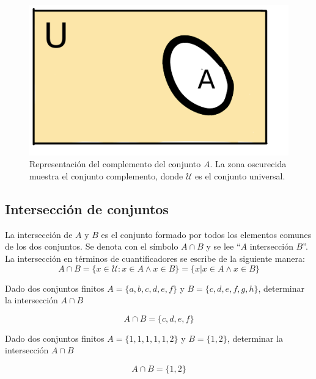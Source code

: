 \begin{center}
	\begin{figure}[ht!]
	\centering
    		\includegraphics[scale=0.5]{FiguresBM/complemento}
    		\caption[Representación del complemento del conjunto $A$]{Representación del complemento del conjunto $A$. La zona oscurecida muestra el conjunto complemento, donde $\mathcal{U}$ es el conjunto universal.}
	\end{figure}
\end{center}

\subsection{Intersección de conjuntos }
La intersección de $A$ y $B$ es el conjunto formado por todos los elementos comunes de los dos conjuntos. Se denota con el símbolo $A\cap B$ y se lee ``$A$ intersección $B$''. La intersección en términos de cuantificadores se escribe de la siguiente manera:\\
\begin{equation}
A\cap B=\{x\in\mathcal{U}:x\in A\wedge x\in B\}=\{x|x\in A\wedge x\in B\}
\end{equation} 

\begin{myexample}
Dado dos conjuntos finitos $A=\{a,b,c,d,e,f\}$ y $B=\{c,d,e,f,g,h\}$, determinar la intersección $A\cap B$
\end{myexample}
\begin{equation*}
A\cap B=\{c,d,e,f\}
\end{equation*}
\begin{myexample}
Dado dos conjuntos finitos $A=\{1,1,1,1,1,2\}$ y $B=\{1,2\}$, determinar la intersección $A\cap B$
\end{myexample}
\begin{equation*}
A\cap B=\{1,2\}
\end{equation*}

